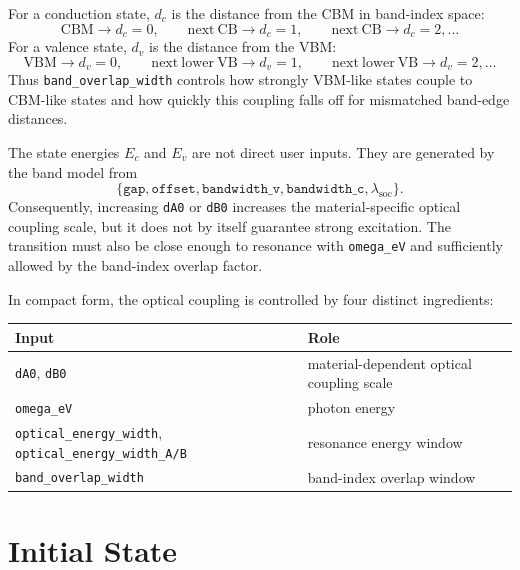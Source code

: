 \documentclass[11pt,a4paper]{article}
\begin{document}
For a conduction state, $d_c$ is the distance from the CBM in band-index space:
\begin{equation}
\mathrm{CBM}\rightarrow d_c=0,\qquad
\mathrm{next\ CB}\rightarrow d_c=1,\qquad
\mathrm{next\ CB}\rightarrow d_c=2,\ldots
\end{equation}
For a valence state, $d_v$ is the distance from the VBM:
\begin{equation}
\mathrm{VBM}\rightarrow d_v=0,\qquad
\mathrm{next\ lower\ VB}\rightarrow d_v=1,\qquad
\mathrm{next\ lower\ VB}\rightarrow d_v=2,\ldots
\end{equation}
Thus \texttt{band\_overlap\_width} controls how strongly VBM-like states couple to CBM-like states and how quickly this coupling falls off for mismatched band-edge distances.

The state energies $E_c$ and $E_v$ are not direct user inputs.  They are generated by the band model from
\begin{equation}
\{\texttt{gap},\texttt{offset},\texttt{bandwidth\_v},\texttt{bandwidth\_c},\lambda_{\mathrm{soc}}\}.
\end{equation}
Consequently, increasing \texttt{dA0} or \texttt{dB0} increases the material-specific optical coupling scale, but it does not by itself guarantee strong excitation.  The transition must also be close enough to resonance with \texttt{omega\_eV} and sufficiently allowed by the band-index overlap factor.

In compact form, the optical coupling is controlled by four distinct ingredients:
\begin{center}
\begin{tabular}{ll}
\toprule
Input & Role \\
\midrule
\texttt{dA0}, \texttt{dB0} & material-dependent optical coupling scale \\
\texttt{omega\_eV} & photon energy \\
\texttt{optical\_energy\_width}, \texttt{optical\_energy\_width\_A/B} & resonance energy window \\
\texttt{band\_overlap\_width} & band-index overlap window \\
\bottomrule
\end{tabular}
\end{center}

\section{Initial State}
\end{document}
